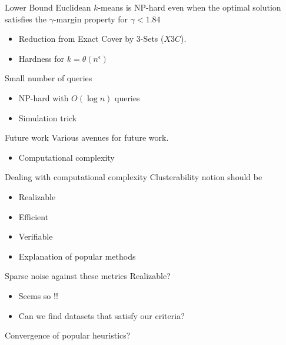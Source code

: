 \documentclass{beamer}
\newcommand*\MyCitem{\item[\color{lb}{\textbullet}]}
\begin{document}
\begin{frame}{Lower Bound}
	Euclidean $k$-means is NP-hard even when the optimal solution satisfies the $\gamma$-margin property for $\gamma < 1.84$
	\vspace{0.3cm} 
	\begin{itemize}
		\item Reduction from Exact Cover by 3-Sets ($X3C$).
    	\vspace{0.3cm}\item Hardness for $k = \theta(n^{\epsilon})$
	\end{itemize}
	\pause
	\vspace{0.7cm}Small number of queries
	\vspace{0.3cm}
	\begin{itemize}	
		\item NP-hard with $O(\log n)$ queries
		\vspace{0.3cm}\item Simulation trick
	\end{itemize}	    
\end{frame}

\begin{frame}{Future work}
	Various avenues for future work.
	\begin{itemize}
		\vspace{0.9cm}\item Computational complexity 
		\vspace{0.9cm}{\color{lb} \MyCitem Under-specificity}
	\end{itemize}
\end{frame}

\begin{frame}{Dealing with computational complexity}
	Clusterability notion should be
	\begin{itemize}
		\vspace{0.3cm}\item Realizable
		\vspace{0.3cm}\item Efficient
		\vspace{0.3cm}\item Verifiable
		\vspace{0.3cm}\item Explanation of popular methods
	\end{itemize}
\end{frame}

\begin{frame}{Sparse noise against these metrics}
	Realizable?
	\begin{itemize}
		\vspace{0.3cm}\item Seems so !!
		\vspace{0.3cm}\item Can we find datasets that satisfy our criteria?
	\end{itemize}
	
	\vspace{1cm}Convergence of popular heuristics?
\end{frame}
\end{document}

